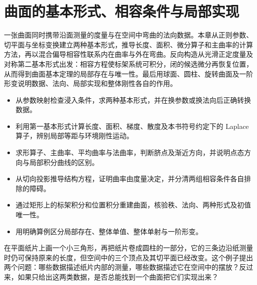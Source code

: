 
% 
% 

\chapter{曲面的基本形式、相容条件与局部实现}
\label{g1:ch:08}

\begin{chapterabstract}
	一张曲面同时携带沿面测量的度量与在空间中弯曲的法向数据。本章从正则参数、切平面与坐标变换建立两种基本形式，推导长度、面积、微分算子和主曲率的计算方法，再以混合偏导相容性联系内在曲率与外在弯曲。反向构造从光滑正定度量及对称第二基本形式出发：相容方程使标架系统可积分，闭的候选微分再恢复位置，从而得到曲面基本定理的局部存在与唯一性。最后用球面、圆柱、旋转曲面及一阶形变说明数据、法向、局部实现和整体刚性各自的作用。
\end{chapterabstract}

\begin{learninggoals}
	\begin{itemize}
		\item 从参数映射检查浸入条件，求两种基本形式，并在换参数或换法向后正确转换数据。
		\item 利用第一基本形式计算长度、面积、梯度、散度及本书符号约定下的 Laplace 算子，辨别局部等距与环境刚性运动。
		\item 求形算子、主曲率、平均曲率与法曲率，判断脐点及渐近方向，并说明点态方向与局部积分曲线的区别。
		\item 从切向投影推导结构方程，证明曲率由度量决定，并分清两组相容条件各自排除的障碍。
		\item 通过矩形上的标架积分和位置积分重建曲面，核验秩、法向、两种形式及初值唯一性。
		\item 用明确算例区分局部存在、整体单值、整体单射与一阶形变。
	\end{itemize}
\end{learninggoals}

在平面纸片上画一个小三角形，再把纸片卷成圆柱的一部分，它的三条边沿纸测量时仍可保持原来的长度，但空间中的三个顶点及其切平面已经改变。这个例子提出两个问题：哪些数据描述纸片内部的测量，哪些数据描述它在空间中的摆放？反过来，如果只给出这两类数据，是否总能找到一个曲面把它们实现出来？

